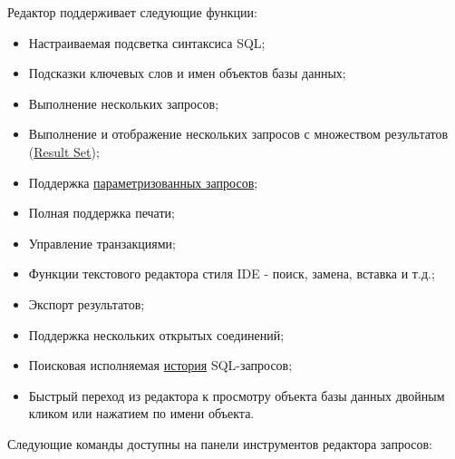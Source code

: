 Редактор поддерживает следующие функции:
\begin{itemize}
	\item Настраиваемая подсветка синтаксиса SQL;
	\item Подсказки ключевых слов и имен объектов базы данных;
	\item Выполнение нескольких запросов;
	\item Выполнение и отображение нескольких запросов с множеством результатов (\hyperref[sec:resultset]{Result Set});
	\item Поддержка \hyperref[sec:param_queries]{параметризованных запросов};
	\item Полная поддержка печати;
	\item Управление транзакциями;
	\item Функции текстового редактора стиля IDE - поиск, замена, вставка и т.д.;
	\item Экспорт результатов;
	\item Поддержка нескольких открытых соединений;
	\item Поисковая исполняемая \hyperref[sec:query_history]{история} SQL-запросов;
	\item Быстрый переход из редактора к просмотру объекта базы данных двойным кликом или нажатием  по имени объекта.
\end{itemize}


Следующие команды доступны на панели инструментов редактора запросов:

